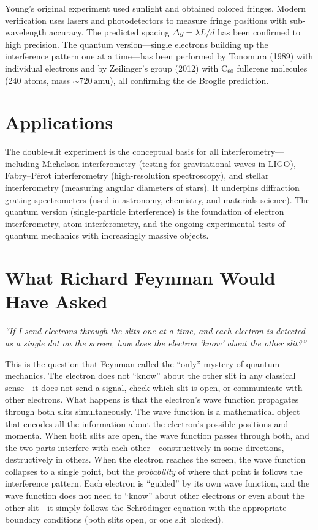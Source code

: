 Young's original experiment used sunlight and obtained colored fringes. Modern verification uses lasers and photodetectors to measure fringe positions with sub-wavelength accuracy. The predicted spacing $\Delta y = \lambda L/d$ has been confirmed to high precision. The quantum version---single electrons building up the interference pattern one at a time---has been performed by Tonomura (1989) with individual electrons and by Zeilinger's group (2012) with C$_{60}$ fullerene molecules (240 atoms, mass $\sim 720\,\text{amu}$), all confirming the de Broglie prediction.
\section*{Applications}

The double-slit experiment is the conceptual basis for all interferometry---including Michelson interferometry (testing for gravitational waves in LIGO), Fabry--Pérot interferometry (high-resolution spectroscopy), and stellar interferometry (measuring angular diameters of stars). It underpins diffraction grating spectrometers (used in astronomy, chemistry, and materials science). The quantum version (single-particle interference) is the foundation of electron interferometry, atom interferometry, and the ongoing experimental tests of quantum mechanics with increasingly massive objects.
\section*{What Richard Feynman Would Have Asked}

\textit{``If I send electrons through the slits one at a time, and each electron is detected as a single dot on the screen, how does the electron `know' about the other slit?''}

This is the question that Feynman called the ``only'' mystery of quantum mechanics. The electron does not ``know'' about the other slit in any classical sense---it does not send a signal, check which slit is open, or communicate with other electrons. What happens is that the electron's wave function propagates through both slits simultaneously. The wave function is a mathematical object that encodes all the information about the electron's possible positions and momenta. When both slits are open, the wave function passes through both, and the two parts interfere with each other---constructively in some directions, destructively in others. When the electron reaches the screen, the wave function collapses to a single point, but the \emph{probability} of where that point is follows the interference pattern. Each electron is ``guided'' by its own wave function, and the wave function does not need to ``know'' about other electrons or even about the other slit---it simply follows the Schrödinger equation with the appropriate boundary conditions (both slits open, or one slit blocked).

